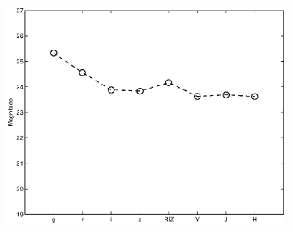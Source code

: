 \documentclass[useAMS,usenatbib,fleqn]{mn2e}
\begin{document}
\begin{figure}
\begin{subfigure}[b]{0.175\textwidth}
                \includegraphics[width=\textwidth]{figures/basis_05.eps}
        \end{subfigure}


\end{figure}
\end{document}
